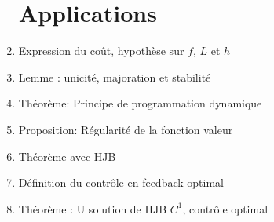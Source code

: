 \documentclass{article}
\begin{document}
\begin{enumerate}
\section{Applications}
	\item Expression du coût, hypothèse sur $f$, $L$ et $h$
	\item Lemme : unicité, majoration et stabilité
	\item Théorème: Principe de programmation dynamique
	\item Proposition: Régularité de la fonction valeur
	\item Théorème avec HJB
	\item Définition du contrôle en feedback optimal
	\item Théorème : U solution de HJB $C^1$, contrôle optimal
\end{enumerate} 
\end{document}
